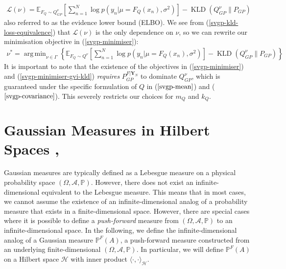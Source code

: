 \documentclass[twoside,11pt]{article}
\newcommand{\KLD}{\operatorname{KLD}}
\DeclareMathOperator*{\argmin}{arg\,min}
\begin{document}
\begin{align}
    \mathcal{L}(\nu) = \mathbb{E}_{F_Q \sim Q_{GP}^{\nu}}\left[\sum_{n=1}^{N}\log p\left(y_n \vert \mu=F_Q(x_n), \sigma^2\right)\right] -\KLD\left(Q^{\nu}_{GP}\Big\| P_{GP}\right) 
    \label{elbo}
\end{align}
also referred to as the evidence lower bound (ELBO). We see from (\ref{svgp-kld-loss-equivalence}) that $\mathcal{L}(\nu)$ is the only dependence on $\nu$, so we can rewrite our minimisation objective in (\ref{svgp-minimiser}):
\begin{align}
    \nu^* = \argmin_{\nu \in \Gamma} \left\{\mathbb{E}_{F_Q \sim Q^{\nu}}\left[\sum_{n=1}^{N}\log p\left(y_n \vert \mu=F_Q(x_n), \sigma^2\right)\right] -\KLD\left(Q^{\nu}_{GP}\Big\| P_{GP}\right)\right\}
    \label{svgp-minimiser-gvi-kld}
\end{align}
It is important to note that the existence of the objectives in (\ref{svgp-minimiser}) and (\ref{svgp-minimiser-gvi-kld}) \textit{requires} $P_{GP}^{F \vert \mathbf{Y}_N}$ to dominate $Q_{GP}^{\nu}$, which is  guaranteed under the specific formulation of $Q$ in ($\ref{svgp-mean}$) and ($\ref{svgp-covariance}$). This severely restricts our choices for $m_Q$ and $k_Q$. 
\section{Gaussian Measures in Hilbert Spaces \cite{wild2022generalized}, \cite{Kukush_2019}}
Gaussian measures are typically defined as a Lebesgue measure on a physical probability space $(\Omega, \mathcal{A}, \mathbb{P})$. However, there does not exist an infinite-dimensional equivalent to the Lebesgue measure. This means that in most cases, we cannot assume the existence of an infinite-dimensional analog of a probability measure that exists in a finite-dimensional space. However, there are special cases where it is possible to define a \textit{push-forward} measure from $(\Omega, \mathcal{A}, \mathbb{P})$ to an infinite-dimensional space. In the following, we define the infinite-dimensional analog of a Gaussian measure  $\mathbb{P}^{F}(A)$, a push-forward measure constructed from an underlying finite-dimensional $(\Omega, \mathcal{A}, \mathbb{P})$. In particular, we will define $\mathbb{P}^{F}(A)$ on a Hilbert space $\mathcal{H}$ with inner product $\langle \cdot, \cdot \rangle_\mathcal{H}$.
\end{document}
